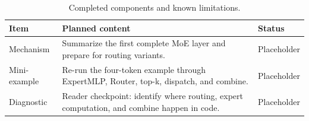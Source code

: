 \begin{table}[H]
\centering
\caption{Completed components and known limitations.}
\label{tab:ch03-chapter-summary-and-handoff}
\begin{tabularx}{\textwidth}{p{}X p{}}
\toprule
Item & Planned content & Status \\
\midrule
Mechanism & Summarize the first complete MoE layer and prepare for routing variants. & Placeholder \\
Mini-example & Re-run the four-token example through ExpertMLP, Router, top-k, dispatch, and combine. & Placeholder \\
Diagnostic & Reader checkpoint: identify where routing, expert computation, and combine happen in code. & Placeholder \\
\bottomrule
\end{tabularx}
\end{table}

